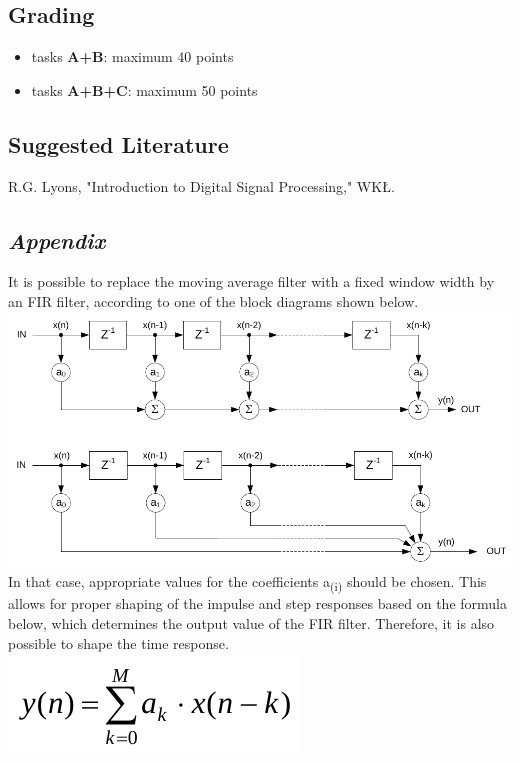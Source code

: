 \documentclass{article}
\begin{document}
\subsection*{Grading}
\begin{itemize}
    \item tasks \textbf{A+B}: maximum 40 points
    \item tasks \textbf{A+B+C}: maximum 50 points
\end{itemize}

\subsection*{Suggested Literature}
R.G. Lyons, "Introduction to Digital Signal Processing," WKŁ.

\newpage
\subsection*{\textit{Appendix}}
It is possible to replace the moving average filter with a fixed window width by an FIR filter, according to one of the block diagrams shown below. \\
\includegraphics[width=\textwidth]{../img/filter_mean_1.png}
In that case, appropriate values for the coefficients a\textsubscript{(i)} should be chosen. This allows for proper shaping of the impulse and step responses based on the formula below, which determines the output value of the FIR filter. Therefore, it is also possible to shape the time response. \\
\includegraphics{../img/filter_mean_2.png}
\end{document}
